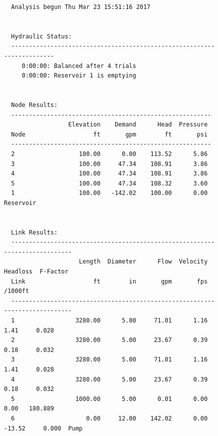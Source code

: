 \documentclass[11pt]{article}
\begin{document}
\begin{enumerate}
\begin{figure}[ht!]
\begin{verbatim}
  Analysis begun Thu Mar 23 15:51:16 2017

   
  Hydraulic Status:
  -----------------------------------------------------------------------
     0:00:00: Balanced after 4 trials
     0:00:00: Reservoir 1 is emptying
   
   
  Node Results:
  --------------------------------------------------------
                  Elevation    Demand      Head  Pressure
  Node                   ft       gpm        ft       psi
  --------------------------------------------------------
  2                  100.00      0.00    113.52      5.86
  3                  100.00     47.34    108.91      3.86
  4                  100.00     47.34    108.91      3.86
  5                  100.00     47.34    108.32      3.60
  1                  100.00   -142.02    100.00      0.00  Reservoir
   
   
  Link Results:
  ----------------------------------------------------------------------------
                     Length  Diameter      Flow  Velocity  Headloss  F-Factor
  Link                   ft        in       gpm       fps   /1000ft          
  ----------------------------------------------------------------------------
  1                 3280.00      5.00     71.01      1.16      1.41     0.028
  2                 3280.00      5.00     23.67      0.39      0.18     0.032
  3                 3280.00      5.00     71.01      1.16      1.41     0.028
  4                 3280.00      5.00     23.67      0.39      0.18     0.032
  5                 1000.00      5.00      0.01      0.00      0.00   180.889
  6                    0.00     12.00    142.02      0.00    -13.52     0.000  Pump
   

\end{verbatim}
\end{figure}
\end{enumerate}
\end{document}
